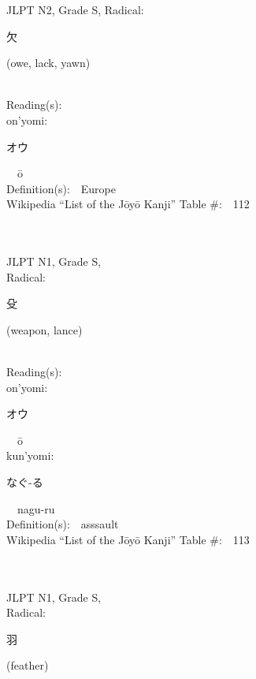\begin{multicols}{2}
{JLPT N2, Grade S, Radical:\ \ {\begin{CJK}{UTF8}{min} 欠 \end{CJK}} (owe, lack, yawn) } \\
Reading(s):\ \ \\
{\hspace*{1em}}on'yomi:\ \ \\
{\hspace*{2em}}{\begin{CJK}{UTF8}{min} オウ \end{CJK}}\ \ \=o\ \ \\
Definition(s):\ \ Europe \\
Wikipedia ``List of the J\=oy\=o Kanji'' Table \#:\ \ 112 \\
\ \ \\
{\fontsize{34pt}{40pt}  }\ \ \\
{JLPT N1, Grade S, \\Radical:\ \ {\begin{CJK}{UTF8}{min} 殳 \end{CJK}} (weapon, lance) } \\
Reading(s):\ \ \\
{\hspace*{1em}}on'yomi:\ \ \\
{\hspace*{2em}}{\begin{CJK}{UTF8}{min} オウ \end{CJK}}\ \ \=o\ \ \\
{\hspace*{1em}}kun'yomi:\ \ \\
{\hspace*{2em}}{\begin{CJK}{UTF8}{min} なぐ-る \end{CJK}}\ \ nagu-ru\ \ \\
Definition(s):\ \ asssault \\
Wikipedia ``List of the J\=oy\=o Kanji'' Table \#:\ \ 113 \\
\ \ \\
{\fontsize{34pt}{40pt}  }\ \ \\
{JLPT N1, Grade S, \\Radical:\ \ {\begin{CJK}{UTF8}{min} 羽 \end{CJK}} (feather) } \\

\end{multicols}
